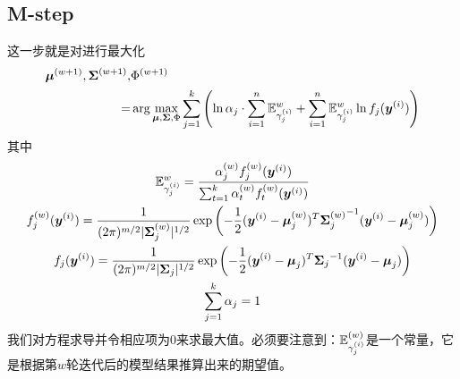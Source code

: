 \documentclass[a4paper,UTF8]{article}
\begin{document}
\subsection{M-step}
这一步就是对进行最大化\begin{equation}
    \begin{split}
        \myvec{\mu}^{(w+1)},\myvec{\Sigma}^{(w+1)},&\Phi^{(w+1)}\\=&\arg\max_{\myvec{\mu},\myvec{\Sigma},\Phi}\sum_{j=1}^k\left( 
            \ln\alpha_j\cdot\sum_{i=1}^n\expectation_{\gamma^{(i)}_j}^w+\sum_{i=1}^n\expectation_{\gamma^{(i)}_j}^w\ln f_j(\myvec{y}^{(i)})
        \right)
    \end{split}
\end{equation}其中\begin{gather}
    \expectation_{\gamma^{(i)}_j}^w=\frac{
        \alpha^{(w)}_jf^{(w)}_j(\myvec{y}^{(i)})
    }{
        \sum_{t=1}^k\alpha^{(w)}_tf^{(w)}_t(\myvec{y}^{(i)})
    }\\
    f^{(w)}_j(\myvec{y}^{(i)})=\ngaussiandistvar[m]{\myvec{y}^{(i)}}{\myvec{\mu}_j^{(w)}}{\myvec{\Sigma}_j^{(w)}}\\
    f_j(\myvec{y}^{(i)})=\ngaussiandistvar[m]{\myvec{y}^{(i)}}{\myvec{\mu}_j}{\myvec{\Sigma}_j}\\
    \sum_{j=1}^k\alpha_j=1
\end{gather}我们对方程求导并令相应项为0来求最大值。必须要注意到：\(\expectation^{(w)}_{\gamma_j^{(i)}}\)是一个常量，它是根据第\(w\)轮迭代后的模型结果推算出来的期望值。
\end{document}

